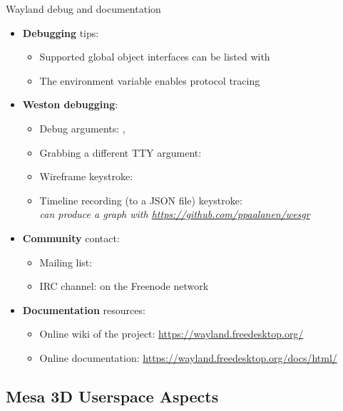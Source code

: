 \begin{frame}[fragile]{Wayland debug and documentation}
  \begin{itemize}
  \item \textbf{Debugging} tips:
    \begin{itemize}
    \item Supported global object interfaces can be listed with 
    \item The  environment variable enables protocol tracing
    \end{itemize}
  \item \textbf{Weston debugging}:
    \begin{itemize}
    \item Debug arguments: , 
    \item Grabbing a different TTY argument: 
    \item Wireframe keystroke: 
    \item Timeline recording (to a JSON file) keystroke: \\
      \textit{can produce a graph with \url{https://github.com/ppaalanen/wesgr}}
    \end{itemize}
  \item \textbf{Community} contact:
    \begin{itemize}
    \item Mailing list: 
    \item IRC channel:  on the Freenode network
    \end{itemize}
  \item \textbf{Documentation} resources:
    \begin{itemize}
    \item Online wiki of the project: \url{https://wayland.freedesktop.org/}
    \item Online documentation: \url{https://wayland.freedesktop.org/docs/html/}
    \end{itemize}
  \end{itemize}
\end{frame}

\subsection{Mesa 3D Userspace Aspects}

